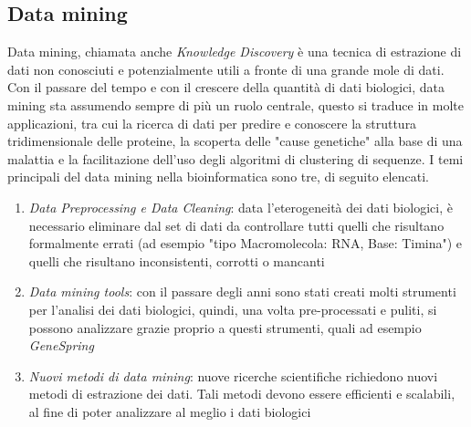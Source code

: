 \subsection{Data mining}
Data mining, chiamata anche \textit{Knowledge Discovery} è una tecnica di estrazione di dati non conosciuti e potenzialmente utili a fronte di una grande mole di dati. Con il passare del tempo e con il crescere della quantità di dati biologici, data mining sta assumendo sempre di più un ruolo centrale, questo si traduce in molte applicazioni, tra cui la ricerca di dati per predire e conoscere la struttura tridimensionale delle proteine, la scoperta delle "cause genetiche" alla base di una malattia e la facilitazione dell'uso degli algoritmi di clustering di sequenze.
\newline
I temi principali del data mining nella bioinformatica sono tre, di seguito elencati.
\begin{enumerate}
	\item \textit{Data Preprocessing e Data Cleaning}: data l'eterogeneità dei dati biologici, è necessario eliminare dal set di dati da controllare tutti quelli che risultano formalmente errati (ad esempio "tipo Macromolecola: RNA, Base: Timina") e quelli che risultano inconsistenti, corrotti o mancanti
	\item \textit{Data mining tools}: con il passare degli anni sono stati creati molti strumenti per l'analisi dei dati biologici, quindi, una volta pre-processati e puliti, si possono analizzare grazie proprio a questi strumenti, quali ad esempio \textit{GeneSpring}
	\item \textit{Nuovi metodi di data mining}: nuove ricerche scientifiche richiedono nuovi metodi di estrazione dei dati. Tali metodi devono essere efficienti e scalabili, al fine di poter analizzare al meglio i dati biologici
\end{enumerate}

